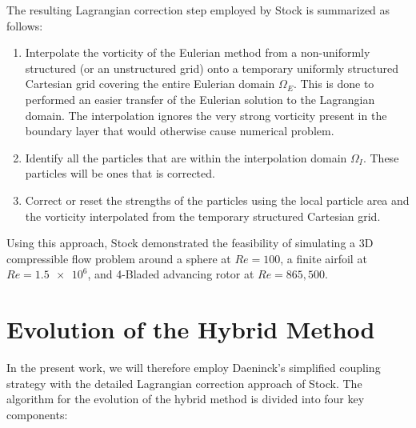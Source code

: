 	The resulting Lagrangian correction step employed by Stock is summarized as follows:
	
	\begin{enumerate}
	\item Interpolate the vorticity of the Eulerian method from a non-uniformly structured (or an unstructured grid) onto a temporary uniformly structured Cartesian grid covering the entire Eulerian domain $\Omega_E$. This is done to performed an easier transfer of the Eulerian solution to the Lagrangian domain. The interpolation ignores the very strong vorticity present in the boundary layer that would otherwise cause numerical problem.
	
	\item Identify all the particles that are within the interpolation domain $\Omega_I$. These particles will be ones that is corrected.
	
	\item Correct or reset the strengths of the particles using the local particle area and the vorticity interpolated from the temporary structured Cartesian grid.
	\end{enumerate}
	
	Using this approach, Stock demonstrated the feasibility of simulating a 3D compressible flow problem around a sphere at $Re=100$, a finite airfoil at $Re=\num{1.5e6}$, and 4-Bladed advancing rotor at $Re=865,500$.
	
	\section{Evolution of the Hybrid Method}

	In the present work, we will therefore employ Daeninck's simplified coupling strategy with the detailed Lagrangian correction approach of Stock. The algorithm for the evolution of the hybrid method is divided into four key components:

